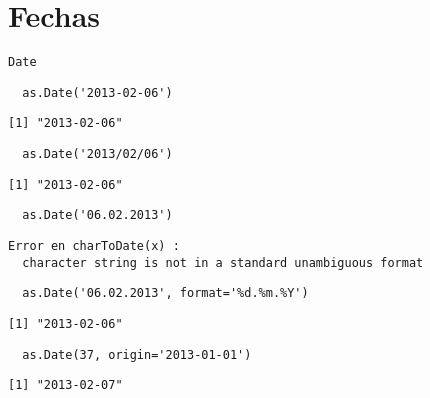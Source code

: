 \documentclass[xcolor={usenames,svgnames,dvipsnames}]{beamer}
\begin{document}
\section{Fechas}
\label{sec-2}
\begin{frame}[fragile,label=sec-2-1]{\texttt{Date}}
 \lstset{language=R,label= ,caption= ,numbers=none}
\begin{lstlisting}
  as.Date('2013-02-06')
\end{lstlisting}

\begin{verbatim}
[1] "2013-02-06"
\end{verbatim}

\lstset{language=R,label= ,caption= ,numbers=none}
\begin{lstlisting}
  as.Date('2013/02/06')
\end{lstlisting}

\begin{verbatim}
[1] "2013-02-06"
\end{verbatim}

\lstset{language=R,label= ,caption= ,numbers=none}
\begin{lstlisting}
  as.Date('06.02.2013')
\end{lstlisting}

\begin{verbatim}
Error en charToDate(x) : 
  character string is not in a standard unambiguous format
\end{verbatim}

\lstset{language=R,label= ,caption= ,numbers=none}
\begin{lstlisting}
  as.Date('06.02.2013', format='%d.%m.%Y')
\end{lstlisting}

\begin{verbatim}
[1] "2013-02-06"
\end{verbatim}

\lstset{language=R,label= ,caption= ,numbers=none}
\begin{lstlisting}
  as.Date(37, origin='2013-01-01')
\end{lstlisting}

\begin{verbatim}
[1] "2013-02-07"
\end{verbatim}
\end{frame}
\end{document}

